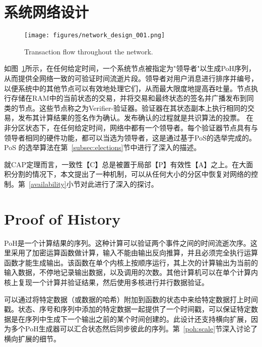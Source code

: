 \documentclass[12pt, uft8]{ctexart}
\begin{document}
\section{系统网络设计}\label{design}

\begin{figure}[h]
  \begin{center}
    \centering
    \texttt{[image: figures/network\_design\_001.png]}
    \caption[Fig 1]{Transaction flow throughout the network.\label{fig:design}}
  \end{center}
  \end{figure}

如图~\ref{fig:design}所示，在任何给定时间，一个系统节点被指定为"领导者"以生成PoH序列，从而提供全网络一致的可验证时间流逝片段。领导者对用户消息进行排序并编号，以便系统中的其他节点可以有效地处理它们，从而最大限度地提高吞吐量。节点执行存储在RAM中的当前状态的交易，并将交易和最终状态的签名并广播发布到同类的节点。这些节点称之为Verifier-验证器。验证器在其状态副本上执行相同的交易，发布其计算结果的签名作为确认。发布确认的过程就是共识算法的投票。
在非分区状态下，在任何给定时间，网络中都有一个领导者。每个验证器节点具有与领导者相同的硬件功能，都可以当选为领导者，这是通过基于PoS的选举完成的。PoS 的选举算法在第~\ref{subsec:elections}节中进行了深入的描述。

就CAP定理而言，一致性【C】总是被置于局部【P】有效性【A】之上。在大面积分割的情况下，本文提出了一种机制，可以从任何大小的分区中恢复对网络的控制。第~\ref{availability}小节对此进行了深入的探讨。

\section{Proof of History}\label{proof_of_history}

PoH是一个计算结果的序列。这种计算可以验证两个事件之间的时间流逝次序。这里采用了加密运算函数做计算，输入不能由输出反向推算，并且必须完全执行运算函数才能生成输出。该函数在单个内核上按顺序运行，其上次的计算输出为当前的输入数据，不停地记录输出数据，以及调用的次数。其他计算机可以在单个计算内核上复现一个计算并验证结果，然后使用多核进行并行数据验证。

可以通过将特定数据（或数据的哈希）附加到函数的状态中来给特定数据打上时间戳。状态、序号和序列中添加的特定数据一起提供了一个时间戳，可以保证特定数据是在序列中生成下一个输出之前的某个时间创建的。此设计还支持横向扩展，因为多个PoH生成器可以汇合状态然后同步彼此的序列。第~\ref{poh:scale}节深入讨论了横向扩展的细节。\\
\end{document}
